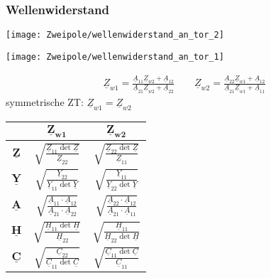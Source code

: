 \subsubsection{Wellenwiderstand}
\begin{minipage}{0.5\columnwidth}
\texttt{[image: Zweipole/wellenwiderstand\_an\_tor\_2]}
\end{minipage}
\begin{minipage}{0.5\columnwidth}
	\texttt{[image: Zweipole/wellenwiderstand\_an\_tor\_1]}
\end{minipage}
\begin{gather*}
	\boxed{
	\underline{Z}_{w1} = \frac{\underline{A}_{11}\underline{Z}_{w2} + \underline{A}_{12}}{\underline{A}_{21}\underline{Z}_{w2}+\underline{A}_{22}}
	} \qquad \boxed{
  	\underline{Z}_{w2} = \frac{\underline{A}_{22}\underline{Z}_{w1} + \underline{A}_{12}}{\underline{A}_{21}\underline{Z}_{w1}+\underline{A}_{11}}
  	}
\end{gather*}
    	\renewcommand{\arraystretch}{2.5}
    	symmetrische ZT: $\underline{Z}_{w1}=\underline{Z}_{w2}$\\
        \begin{tabular}{|c|c|c|}
        	\hline
            & $\boldsymbol{\underline{Z}_{w1}}$ & $\boldsymbol{\underline{Z}_{w2}}$
           \\
            \hline
            $\underline{\boldsymbol{Z}}$ & $\sqrt{\frac{\underline{Z}_{11}\operatorname{det}\underline{Z}}{\underline{Z}_{22}}}$ & $\sqrt{\frac{\underline{Z}_{22}\operatorname{det}\underline{Z}}{\underline{Z}_{11}}}$
            \\
            \hline
            $\underline{\boldsymbol{Y}}$ & $\sqrt{\frac{\underline{Y}_{22}}{\underline{Y}_{11}\operatorname{det}\underline{Y}}}$ & $\sqrt{\frac{\underline{Y}_{11}}{\underline{Y}_{22}\operatorname{det}\underline{Y}}}$
            \\
            \hline
            $\underline{\boldsymbol{A}}$ & $\sqrt{\frac{\underline{A}_{11}\cdot\underline{A}_{12}}{\underline{A}_{21}\cdot\underline{A}_{22}}}$ & $\sqrt{\frac{\underline{A}_{22}\cdot\underline{A}_{12}}{\underline{A}_{21}\cdot\underline{A}_{11}}}$
            \\
            \hline
            $\underline{\boldsymbol{H}}$ & $\sqrt{\frac{\underline{H}_{11}\operatorname{det}\underline{H}}{\underline{H}_{22}}}$ & $\sqrt{\frac{\underline{H}_{11}}{\underline{H}_{22}\operatorname{det}\underline{H}}}$
            \\
            \hline
            $\underline{\boldsymbol{C}}$ & $\sqrt{\frac{\underline{C}_{22}}{\underline{C}_{11}\operatorname{det}\underline{C}}}$ & $\sqrt{\frac{\underline{C}_{11}\operatorname{det}\underline{C}}{\underline{C}_{11}}}$
            \\
            \hline
        \end{tabular}\\
        \normalsize
    
